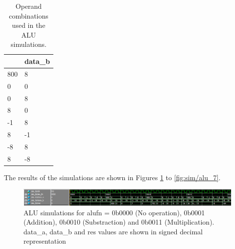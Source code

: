 \begin{table}[H]
    \centering
    \begin{tabular}{|l|l|}
    \hline
    \rowcolor[HTML]{DAE8FC} 
    \multicolumn{1}{|c|}{\cellcolor[HTML]{DAE8FC}\textbf{data\_a}} & \multicolumn{1}{c|}{\cellcolor[HTML]{DAE8FC}\textbf{data\_b}} \\ \hline
    800                                                            & 8                                                             \\ \hline
    0                                                              & 0                                                             \\ \hline
    0                                                              & 8                                                             \\ \hline
    8                                                              & 0                                                             \\ \hline
    -1                                                             & 8                                                             \\ \hline
    8                                                              & -1                                                            \\ \hline
    -8                                                             & 8                                                             \\ \hline
    8                                                              & -8                                                            \\ \hline
    \end{tabular}
    \caption{Operand combinations used in the ALU simulations.}
    \label{tab:alu/sim}
\end{table}

The results of the simulations are shown in Figures \ref{fig:sim/alu_0} to \ref{fig:sim/alu_7}.

\begin{figure}[H]
    \centering
    \includegraphics[width=\linewidth]{Chapter3-CPU/res/alu_simu_0.PNG}
    \caption{ALU simulations for alufn = 0b0000 (No operation), 0b0001 (Addition), 0b0010 (Substraction) 
    and 0b0011 (Multiplication). data\_a, data\_b and res values are shown in signed decimal 
    representation}
    \label{fig:sim/alu_0}
\end{figure}

